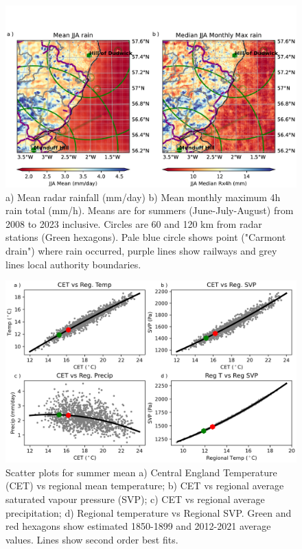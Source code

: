 \documentclass[11pt,a4paper]{article}
\begin{document}
\begin{figure}
	\centering
	\includegraphics[width=\linewidth]{radar_jja}
	\caption{a) Mean radar rainfall (mm/day) b) Mean monthly maximum 4h rain total (mm/h). Means are for summers (June-July-August) from 2008 to 2023 inclusive. Circles are  60 and 120 km from radar stations (Green hexagons). Pale blue circle shows point ("Carmont drain") where rain occurred, purple lines show railways and grey lines local authority boundaries. }
	\label{fig:mean_rain}
\end{figure}


\begin{figure}[tp]
	\centering
	\includegraphics[width=\linewidth]{scatter.png}
	\caption{Scatter plots for summer mean  a)  Central England Temperature (CET) vs  regional mean temperature; b) CET vs regional average saturated vapour pressure (SVP); c) CET vs regional average precipitation; d) Regional temperature vs Regional SVP. Green and red hexagons show estimated 1850-1899 and 2012-2021 average values. Lines show second order best fits.}
	\label{fig:cet_scatter}
\end{figure}
\end{document}
